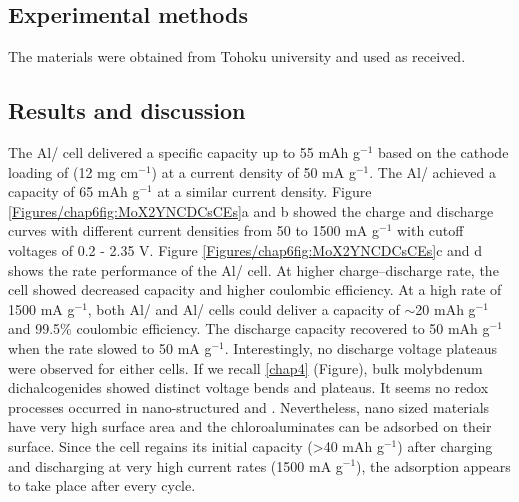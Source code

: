 \subsection{Experimental methods}
The materials were obtained from Tohoku university and used as received. 

\subsection{Results and discussion}
The Al/ cell delivered a specific capacity up to 55 mAh g$^{-1}$ based on the cathode loading of  (12 mg cm$^{-1}$) at a current density of 50 mA g$^{-1}$. The Al/ achieved a  capacity of 65 mAh g$^{-1}$ at a similar current density. Figure \ref{Figures/chap6fig:MoX2YNCDCsCEs}a and b showed the charge and discharge curves with different current densities from 50 to 1500 mA g$^{-1}$ with cutoff voltages of 0.2 - 2.35 V. Figure \ref{Figures/chap6fig:MoX2YNCDCsCEs}c and d shows the rate performance of the Al/ cell. At higher charge–discharge rate, the cell showed decreased capacity and higher coulombic efficiency. At a high rate of 1500 mA g$^{-1}$, both Al/ and Al/ cells could deliver a capacity of $\sim$20 mAh g$^{-1}$ and 99.5\% coulombic efficiency. The discharge capacity recovered to 50 mAh g$^{-1}$ when the rate slowed to 50 mA g$^{-1}$. Interestingly, no discharge voltage plateaus were observed for either cells. If we recall \ref{chap4} (Figure), bulk molybdenum dichalcogenides showed distinct voltage bends and plateaus. It seems no redox processes occurred in nano-structured  and . Nevertheless, nano sized materials have very high surface area and the chloroaluminates can be adsorbed on their surface. Since the cell regains its initial capacity (>40 mAh g$^{-1}$) after charging and discharging at very high current rates (1500 mA g$^{-1}$), the adsorption appears to take place after every cycle.  

